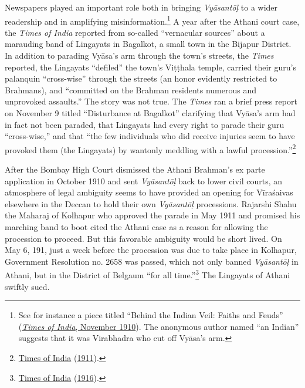 Newspapers played an important role both in bringing \emph{Vyāsantōḷ} to a wider readership and in amplifying misinformation.\footnote{%
See for instance a piece titled “Behind the Indian Veil: Faiths and Feuds” (\hyperref[ToI1910b]{\emph{Times of India}, November 1910}). The anonymous author named “an Indian” suggests that it was Virabhadra who cut off Vyāsa’s arm.
}
 A year after the Athani court case, the \emph{Times of India} reported from so-called “vernacular sources” about a marauding band of Lingayats in Bagalkot, a small town in the Bijapur District. In addition to parading Vyāsa’s arm through the town’s streets, the \emph{Times} reported, the Lingayats “defiled” the town’s Viṭṭhala temple, carried their guru’s palanquin “cross-wise” through the streets (an honor evidently restricted to Brahmans), and “committed on the Brahman residents numerous and unprovoked assaults.” The story was not true. The \emph{Times} ran a brief press report on November 9 titled “Disturbance at Bagalkot” clarifying that Vyāsa’s arm had in fact not been paraded, that Lingayats had every right to parade their guru “cross-wise,” and that “the few individuals who did receive injuries seem to have provoked them (the Lingayats) by wantonly meddling with a lawful procession.”\footnote{%
\hyperref[ToI1911]{Times of India} (\hyperref[ToI1911]{1911}).
}



After the Bombay High Court dismissed the Athani Brahman’s ex parte application in October 1910 and sent \emph{Vyāsantōḷ} back to lower civil courts, an atmosphere of legal ambiguity seems to have provided an opening for Vīraśaivas elsewhere in the Deccan to hold their own \emph{Vyāsantōḷ} processions. Rajarshi Shahu  \Dash  the Maharaj of Kolhapur who approved the parade in May 1911 and promised his marching band to boot  \Dash  cited the Athani case as a reason for allowing the procession to proceed. But this favorable ambiguity would be short lived. On May 6, 191, just a week before the procession was due to take place in Kolhapur, Government Resolution no. 2658 was passed, which not only banned \emph{Vyāsantōḷ} in Athani, but in the District of Belgaum “for all time.”\footnote{%
\hyperref[ToI1916]{Times of India} (\hyperref[ToI1916]{1916}).
}
 The Lingayats of Athani swiftly sued. 


